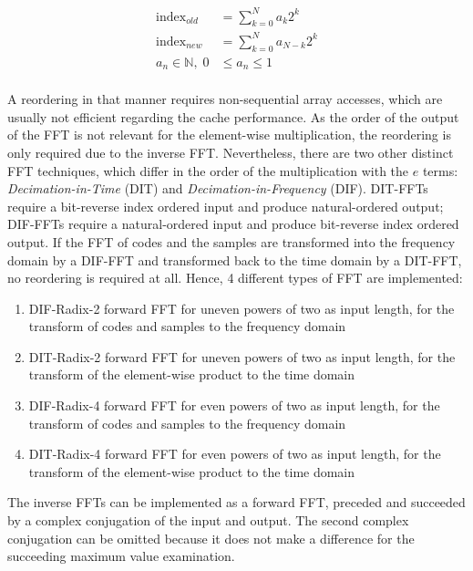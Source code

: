 \begin{align*}
    \text{index}_{old} &= \sum_{k=0}^{N} a_{k}2^{k}\\
    \text{index}_{new} &= \sum_{k=0}^{N} a_{N-k}2^{k}\\
    a_{n} \in \mathbb{N},\; 0 &\leq a_{n} \leq 1\\
\end{align*}

A reordering in that manner requires non-sequential array accesses, which are usually not efficient regarding the cache performance. As the order of the output of the FFT is not relevant for the element-wise multiplication, the reordering is only required due to the inverse FFT. Nevertheless, there are two other distinct FFT techniques, which differ in the order of the multiplication with the $e$ terms: \emph{Decimation-in-Time} (DIT) and \emph{Decimation-in-Frequency} (DIF). DIT-FFTs require a bit-reverse index ordered input and produce natural-ordered output; DIF-FFTs require a natural-ordered input and produce bit-reverse index ordered output. If the FFT of codes and the samples are transformed into the frequency domain by a DIF-FFT and transformed back to the time domain by a DIT-FFT, no reordering is required at all. Hence, 4 different types of FFT are implemented:

\begin{enumerate}
    \item DIF-Radix-2 forward FFT for uneven powers of two as input length, for the transform of codes and samples to the frequency domain
    \item DIT-Radix-2 forward FFT for uneven powers of two as input length, for the transform of the element-wise product to the time domain
    \item DIF-Radix-4 forward FFT for even powers of two as input length, for the transform of codes and samples to the frequency domain
    \item DIT-Radix-4 forward FFT for even powers of two as input length, for the transform of the element-wise product to the time domain
\end{enumerate}

The inverse FFTs can be implemented as a forward FFT, preceded and succeeded by a complex conjugation of the input and output. The second complex conjugation can be omitted because it does not make a difference for the succeeding maximum value examination.

